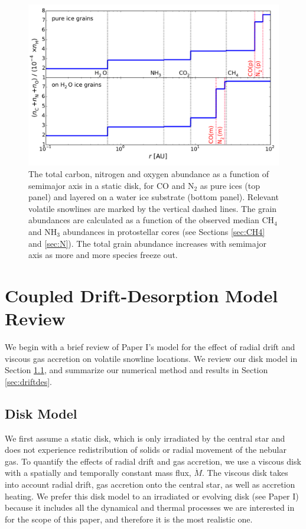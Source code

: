 \documentclass[apj]{emulateapj}
\begin{document}
\begin{figure}[t!]
\centering
\includegraphics[width=\textwidth]{../../figs/CNO_and_snowlines_2.pdf}
\caption{The total carbon, nitrogen and oxygen abundance as a function of semimajor axis in a static disk, for CO and N$_2$ as pure ices (top panel) and layered on a water ice substrate (bottom panel). Relevant volatile snowlines are marked by the vertical dashed lines. The grain abundances are calculated as a function of the observed median CH$_4$ and NH$_3$ abundances in protostellar cores (see Sections \ref{sec:CH4} and \ref{sec:N}). The total grain abundance increases with semimajor axis as more and more species freeze out.} 
\label{fig:CNOstatic}
\end{figure}

\section{Coupled Drift-Desorption Model Review}
\label{sec:review}

We begin with a brief review of Paper I's model for the effect of radial drift and viscous gas accretion on volatile snowline locations. We review our disk model in Section \ref{sec:disktime}, and summarize our numerical method and results in Section \ref{sec:driftdes}.

\subsection{Disk Model}
\label{sec:disktime}

We first assume a static disk, which is only irradiated by the central star and does not experience redistribution of solids or radial movement of the nebular gas. To quantify the effects of radial drift and gas accretion, we use a viscous disk with a spatially and temporally constant mass flux, $\dot{M}$. The viscous disk takes into account radial drift, gas accretion onto the central star, as well as accretion heating. We prefer this disk model to an irradiated or evolving disk (see Paper I) because it includes all the dynamical and thermal processes we are interested in for the scope of this paper, and therefore it is the most realistic one.  
\end{document}
